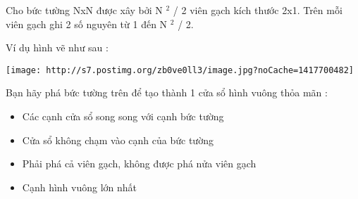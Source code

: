 Cho bức tường NxN được xây bởi N $^ 2 $ / 2 viên gạch kích thước 2x1. Trên mỗi viên gạch ghi 2 số nguyên từ 1 đến N $^ 2 $ / 2.

Ví dụ hình vẽ như sau :


\texttt{[image: http://s7.postimg.org/zb0ve0ll3/image.jpg?noCache=1417700482]}

Bạn hãy phá bức tường trên để tạo thành 1 cửa sổ hình vuông thỏa mãn :
\begin{itemize}
	\item Các cạnh cửa sổ song song với cạnh bức tường
	\item Cửa sổ không chạm vào cạnh của bức tường
	\item Phải phá cả viên gạch, không được phá nửa viên gạch
	\item Cạnh hình vuông lớn nhất
\end{itemize}
